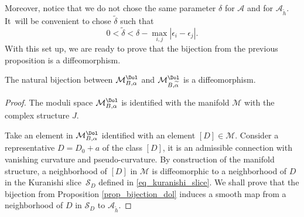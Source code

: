 Moreover, notice that we do not chose the same parameter $\delta$ for $\mathcal{A}$ and for $\mathcal{A}_{\widetilde{h}}$. It~will be convenient to chose $\widetilde{\delta}$ such that
\begin{equation}\label{eq_delta_t_small}
0 < \widetilde{\delta} < \delta - \max_{i,j} |\epsilon_i-\epsilon_j|.
\end{equation}
With this set up, we are ready to prove that the bijection from the previous proposition is a diffeomorphism.
\begin{theorem}\label{th_diffeo_var_alpha}
The natural bijection between $\mathcal{M}^{\Dol}_{B,\alpha}$ and $\mathcal{M}^{\Dol}_{B,\widetilde{\alpha}}$ is a diffeomorphism.
\end{theorem}
\begin{proof}
The moduli space $\mathcal{M}^{\Dol}_{B,\alpha}$ is identified with the manifold $\mathcal{M}$ with the complex structure $J$.

Take an element in $\mathcal{M}^{\Dol}_{B,\alpha}$ identified with an element $[D]\in\mathcal{M}$. Consider a representative $D=D_0+a$ of the class $[D]$, it is an admissible connection with vanishing curvature and pseudo-curvature. By construction of the manifold structure, a neighborhood of $[D]$ in $\mathcal{M}$ is diffeomorphic to a neighborhood of $D$ in the Kuranishi slice~$\mathcal{S}_{D}$ defined in \eqref{eq_kuranishi_slice}. We shall prove that the bijection from Proposition \ref{prop_bijection_dol} induces a smooth map from a neighborhood of $D$ in $\mathcal{S}_{D}$ to $\mathcal{A}_{\widetilde{h}}$.


\end{proof}
